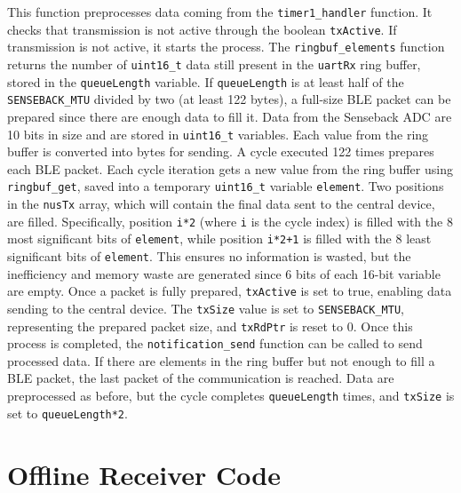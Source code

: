 \documentclass{Configuration_Files/PoliMi3i_thesis}
\begin{document}
This function preprocesses data coming from the \texttt{timer1\_handler} function. It checks that transmission is not active through the boolean \texttt{txActive}. If transmission is not active, it starts the process. The \texttt{ringbuf\_elements} function returns the number of \texttt{uint16\_t} data still present in the \texttt{uartRx} ring buffer, stored in the \texttt{queueLength} variable. If \texttt{queueLength} is at least half of the \texttt{SENSEBACK\_MTU} divided by two (at least 122 bytes), a full-size BLE packet can be prepared since there are enough data to fill it. Data from the Senseback ADC are 10 bits in size and are stored in \texttt{uint16\_t} variables. Each value from the ring buffer is converted into bytes for sending. A cycle executed 122 times prepares each BLE packet. Each cycle iteration gets a new value from the ring buffer using \texttt{ringbuf\_get}, saved into a temporary \texttt{uint16\_t} variable \texttt{element}. Two positions in the \texttt{nusTx} array, which will contain the final data sent to the central device, are filled. Specifically, position \texttt{i*2} (where \texttt{i} is the cycle index) is filled with the 8 most significant bits of \texttt{element}, while position \texttt{i*2+1} is filled with the 8 least significant bits of \texttt{element}. This ensures no information is wasted, but the inefficiency and memory waste are generated since 6 bits of each 16-bit variable are empty. Once a packet is fully prepared, \texttt{txActive} is set to true, enabling data sending to the central device. The \texttt{txSize} value is set to \texttt{SENSEBACK\_MTU}, representing the prepared packet size, and \texttt{txRdPtr} is reset to 0. Once this process is completed, the \texttt{notification\_send} function can be called to send processed data. If there are elements in the ring buffer but not enough to fill a BLE packet, the last packet of the communication is reached. Data are preprocessed as before, but the cycle completes \texttt{queueLength} times, and \texttt{txSize} is set to \texttt{queueLength*2}.

\section*{Offline Receiver Code}
\end{document}
